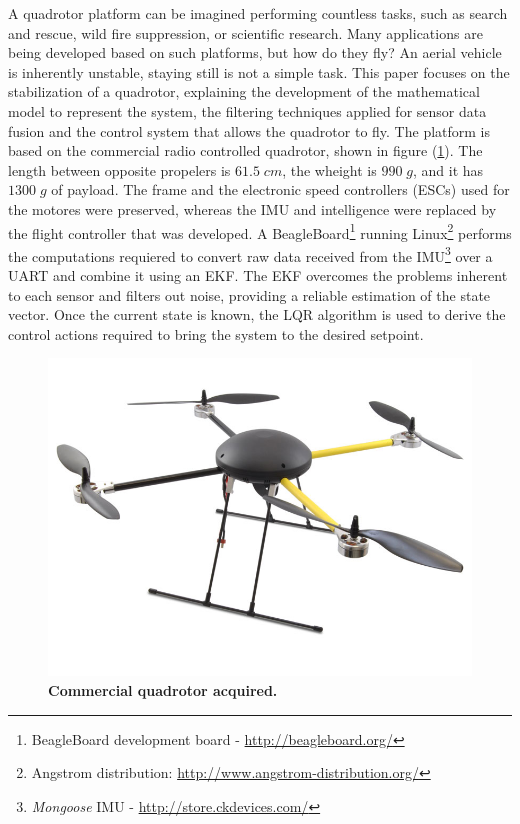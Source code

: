 \documentclass[conference]{IEEEtran}
\newcommand{\refp}[1]{(\ref{#1})}
\begin{document}
A quadrotor platform can be imagined performing countless tasks, such as search and rescue, wild fire suppression, or scientific research\cite{bib:apps}. Many applications are being developed based on such platforms, but how do they fly? An aerial vehicle is inherently unstable, staying still is not a simple task. This paper focuses on the stabilization of a quadrotor, explaining the development of the mathematical model \cite{bib:quadrotor-bible}\cite{bib:curso_quad} to represent the system, the filtering techniques applied for sensor data fusion\cite{bib:kalman}\cite{bib:kalman2} and the control system\cite{bib:quadrotor-bible}\cite{bib:lqrnotes} that allows the quadrotor to fly.
The platform is based on the commercial radio controlled quadrotor, shown in figure \refp{fig:commercial_quadrotor}. The length between opposite propelers is $61.5\;cm$, the wheight is $990\;g$, and it has $1300\;g$ of payload. The frame and the electronic speed controllers (ESCs) used for the motores were preserved, whereas the IMU and intelligence were replaced by the flight controller that was developed. A BeagleBoard\footnote{BeagleBoard development board - \url{http://beagleboard.org/}} running Linux\footnote{Angstrom distribution: \url{http://www.angstrom-distribution.org/}} performs the computations requiered to convert raw data received from the IMU\footnote{\textit{Mongoose} IMU - \url{http://store.ckdevices.com/}} over a UART and combine it using an EKF. The EKF overcomes the problems inherent to each sensor and filters out noise, providing a reliable estimation of the state vector. Once the current state is known, the LQR algorithm\cite{bib:lqrnotes}\cite{bib:lqr-discreto} is used to derive the control actions required to bring the system to the desired setpoint.
\begin{figure}[h!]
	\centering
	\includegraphics[width=.6\columnwidth]{./pics_paper/foto_quad.jpg}
	\caption{\textbf{Commercial quadrotor acquired.}}
	\label{fig:commercial_quadrotor}
\end{figure}
\end{document}
